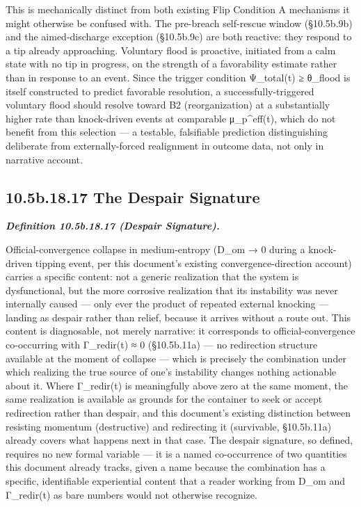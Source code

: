 \documentclass[
]{article}
\begin{document}
This is mechanically distinct from both existing Flip Condition A
mechanisms it might otherwise be confused with. The pre-breach
self-rescue window (§10.5b.9b) and the aimed-discharge exception
(§10.5b.9c) are both reactive: they respond to a tip already
approaching. Voluntary flood is proactive, initiated from a calm state
with no tip in progress, on the strength of a favorability estimate
rather than in response to an event. Since the trigger condition
Ψ\_total(t) ≥ θ\_flood is itself constructed to predict favorable
resolution, a successfully-triggered voluntary flood should resolve
toward B2 (reorganization) at a substantially higher rate than
knock-driven events at comparable μ\_p\^{}eff(t), which do not benefit
from this selection --- a testable, falsifiable prediction
distinguishing deliberate from externally-forced realignment in outcome
data, not only in narrative account.

\hypertarget{b.18.17-the-despair-signature}{%
\subsection{10.5b.18.17 The Despair
Signature}\label{b.18.17-the-despair-signature}}

\emph{\textbf{Definition 10.5b.18.17 (Despair Signature).}}

Official-convergence collapse in medium-entropy (D\_om → 0 during a
knock-driven tipping event, per this document's existing
convergence-direction account) carries a specific content: not a generic
realization that the system is dysfunctional, but the more corrosive
realization that its instability was never internally caused --- only
ever the product of repeated external knocking --- landing as despair
rather than relief, because it arrives without a route out. This content
is diagnosable, not merely narrative: it corresponds to
official-convergence co-occurring with Γ\_redir(t) ≈ 0 (§10.5b.11a) ---
no redirection structure available at the moment of collapse --- which
is precisely the combination under which realizing the true source of
one's instability changes nothing actionable about it. Where Γ\_redir(t)
is meaningfully above zero at the same moment, the same realization is
available as grounds for the container to seek or accept redirection
rather than despair, and this document's existing distinction between
resisting momentum (destructive) and redirecting it (survivable,
§10.5b.11a) already covers what happens next in that case. The despair
signature, so defined, requires no new formal variable --- it is a named
co-occurrence of two quantities this document already tracks, given a
name because the combination has a specific, identifiable experiential
content that a reader working from D\_om and Γ\_redir(t) as bare numbers
would not otherwise recognize.
\end{document}
